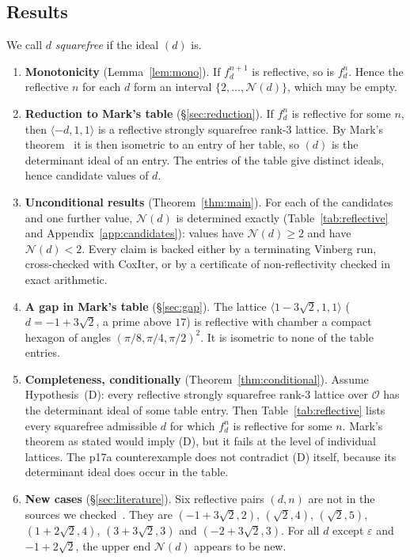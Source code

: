 \documentclass[11pt]{amsart}
\theoremstyle{definition}
\newcommand{\OK}{\mathcal{O}}
\newcommand{\eps}{\varepsilon}
\newcommand{\Nmax}{\mathcal{N}}
\begin{document}
\subsection*{Results}
We call $d$ \emph{squarefree} if the ideal $(d)$ is.
\begin{enumerate}
\item \textbf{Monotonicity} (Lemma~\ref{lem:mono}). If $f_d^{n+1}$ is reflective, so is $f_d^n$.
  Hence the reflective $n$ for each $d$ form an interval $\{2,\dots,\Nmax(d)\}$, which may be
  empty.
\item \textbf{Reduction to Mark's table} (\S\ref{sec:reduction}). If $f_d^n$ is reflective for
  some $n$, then $\langle -d,1,1\rangle$ is a reflective strongly squarefree rank-3 lattice. By
  Mark's theorem~\cite{Mar18} it is then isometric to an entry of her table, so $(d)$ is the
  determinant ideal of an entry. The \NEntries{} entries of the table give \NCand{} distinct
  ideals, hence \NCand{} candidate values of $d$.
\item \textbf{Unconditional results} (Theorem~\ref{thm:main}). For each of the \NCand{}
  candidates and one further value, $\Nmax(d)$ is determined exactly
  (Table~\ref{tab:reflective} and Appendix~\ref{app:candidates}):
  \NRefl{} values have $\Nmax(d)\ge2$ and \NNon{} have $\Nmax(d)<2$. Every claim is backed
  either by a terminating Vinberg run, cross-checked with CoxIter, or by a certificate of
  non-reflectivity checked in exact arithmetic.
\item \textbf{A gap in Mark's table} (\S\ref{sec:gap}). The lattice
  $\langle 1-3\sqrt2,1,1\rangle$ ($d=-1+3\sqrt2$, a prime above $17$) is reflective with
  chamber a compact hexagon of angles $(\pi/8,\pi/4,\pi/2)^2$. It is isometric to none of
  the table entries.
\item \textbf{Completeness, conditionally} (Theorem~\ref{thm:conditional}). Assume
  Hypothesis~(D): every reflective strongly squarefree rank-3 lattice over $\OK$ has the
  determinant ideal of some table entry. Then Table~\ref{tab:reflective} lists every
  squarefree admissible $d$ for which $f_d^n$ is reflective for some $n$. Mark's theorem as
  stated would imply (D), but it fails at the level of individual lattices. The p17a
  counterexample does not contradict (D) itself, because its determinant ideal does occur
  in the table.
\item \textbf{New cases} (\S\ref{sec:literature}). Six reflective pairs $(d,n)$ are not in the
  sources we checked~\cite{Bug90,Mar18,Bog20,Gug17}. They are $(-1+3\sqrt2,2)$, $(\sqrt2,4)$,
  $(\sqrt2,5)$, $(1+2\sqrt2,4)$, $(3+3\sqrt2,3)$ and $(-2+3\sqrt2,3)$. For all $d$ except
  $\eps$ and $-1+2\sqrt2$, the upper end $\Nmax(d)$ appears to be new.
\end{enumerate}
\end{document}

